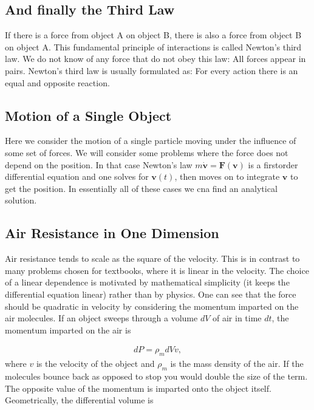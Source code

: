 \documentclass[letterpaper,10pt,english]{sphinxmanual}
\begin{document}
\subsection{And finally the Third Law}
\label{\detokenize{chapter3:and-finally-the-third-law}}
If there is a force from object A on object B, there is also a force from object B on object A.
This fundamental principle of interactions is called Newton’s third law. We do not
know of any force that do not obey this law: All forces appear in pairs. Newton’s
third law is usually formulated as: For every action there is an equal and opposite
reaction.


\subsection{Motion of a Single Object}
\label{\detokenize{chapter3:motion-of-a-single-object}}
Here we consider the motion of a single particle moving under
the influence of some set of forces.  We will consider some problems where
the force does not depend on the position. In that case Newton’s law
\(m\dot{\boldsymbol{v}}=\boldsymbol{F}(\boldsymbol{v})\) is a first\sphinxhyphen{}order differential
equation and one solves for \(\boldsymbol{v}(t)\), then moves on to integrate
\(\boldsymbol{v}\) to get the position. In essentially all of these cases we cna find an analytical solution.


\subsection{Air Resistance in One Dimension}
\label{\detokenize{chapter3:air-resistance-in-one-dimension}}
Air resistance tends to scale as the square of the velocity. This is
in contrast to many problems chosen for textbooks, where it is linear
in the velocity. The choice of a linear dependence is motivated by
mathematical simplicity (it keeps the differential equation linear)
rather than by physics. One can see that the force should be quadratic
in velocity by considering the momentum imparted on the air
molecules. If an object sweeps through a volume \(dV\) of air in time
\(dt\), the momentum imparted on the air is




\begin{equation*}
\begin{split}
\begin{equation}
dP=\rho_m dV v,
\label{_auto1} \tag{1}
\end{equation}
\end{split}
\end{equation*}
where \(v\) is the velocity of the object and \(\rho_m\) is the mass
density of the air. If the molecules bounce back as opposed to stop
you would double the size of the term. The opposite value of the
momentum is imparted onto the object itself. Geometrically, the
differential volume is
\end{document}
